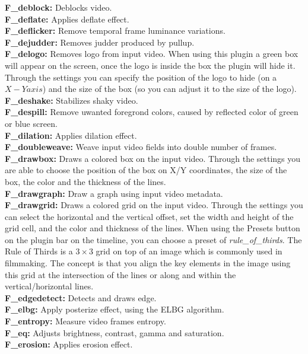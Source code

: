 \textbf{F\_deblock:} Deblocks video.\\
\textbf{F\_deflate:} Applies deflate effect.\\
\textbf{F\_deflicker:} Remove temporal frame luminance variations.\\
\textbf{F\_dejudder:} Removes judder produced by pullup.\\
\textbf{F\_delogo:} Removes logo from input video. When using this plugin a green box will appear on the screen, once the logo is inside the box the plugin will hide it. Through the settings you can specify the position of the logo to hide (on a $X-Y axis$) and the size of the box (so you can adjust it to the size of the logo). \\
\textbf{F\_deshake:} Stabilizes shaky video.\\
\textbf{F\_despill:} Remove uwanted foregrond colors, caused by reflected color of green or blue screen.\\
\textbf{F\_dilation:} Applies dilation effect.\\
\textbf{F\_doubleweave:} Weave input video fields into double number of frames.\\
\textbf{F\_drawbox:} Draws a colored box on the input video. Through the settings you are able to choose the position of the box on X/Y coordinates, the size of the box, the color and the thickness of the lines.\\
\textbf{F\_drawgraph:} Draw a graph using input video metadata.\\
\textbf{F\_drawgrid:} Draws a colored grid on the input video. Through the settings you can select the horizontal and the vertical offset, set the width and height of the grid cell, and the color and thickness of the lines. When using the Presets button on the plugin bar on the timeline, you can choose a preset of \textit{rule\_of\_thirds}. The Rule of Thirds is a $3\times3$ grid on top of an image which is commonly used in filmmaking. The concept is that you align the key elements in the image using this grid at the intersection of the lines or along and within the vertical/horizontal lines.\\ 
\textbf{F\_edgedetect:} Detects and draws edge.\\
\textbf{F\_elbg:} Apply posterize effect, using the ELBG algorithm.\\
\textbf{F\_entropy:} Measure video frames entropy.\\
\textbf{F\_eq:} Adjusts brightness, contrast, gamma and saturation.\\
\textbf{F\_erosion:} Applies erosion effect.\\
